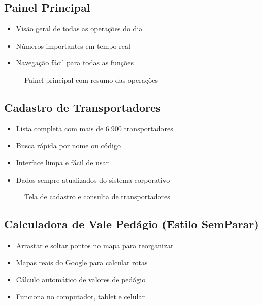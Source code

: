 \documentclass[12pt,a4paper]{article}
\begin{document}
\subsection{Painel Principal}
\begin{itemize}
    \item Visão geral de todas as operações do dia
    \item Números importantes em tempo real
    \item Navegação fácil para todas as funções
\end{itemize}

\begin{figure}[H]
    \centering
    \fbox{\begin{minipage}{12cm}
        \centering
        \vspace{4cm}
        {\large [SCREENSHOT - Dashboard Principal]}
        \vspace{4cm}
    \end{minipage}}
    \caption{Painel principal com resumo das operações}
\end{figure}

\subsection{Cadastro de Transportadores}
\begin{itemize}
    \item Lista completa com mais de 6.900 transportadores
    \item Busca rápida por nome ou código
    \item Interface limpa e fácil de usar
    \item Dados sempre atualizados do sistema corporativo
\end{itemize}

\begin{figure}[H]
    \centering
    \fbox{\begin{minipage}{12cm}
        \centering
        \vspace{4cm}
        {\large [SCREENSHOT - Gestão de Transportadores]}
        \vspace{4cm}
    \end{minipage}}
    \caption{Tela de cadastro e consulta de transportadores}
\end{figure}

\subsection{Calculadora de Vale Pedágio (Estilo SemParar)}
\begin{itemize}
    \item Arrastar e soltar pontos no mapa para reorganizar
    \item Mapas reais do Google para calcular rotas
    \item Cálculo automático de valores de pedágio
    \item Funciona no computador, tablet e celular
\end{itemize}
\end{document}
